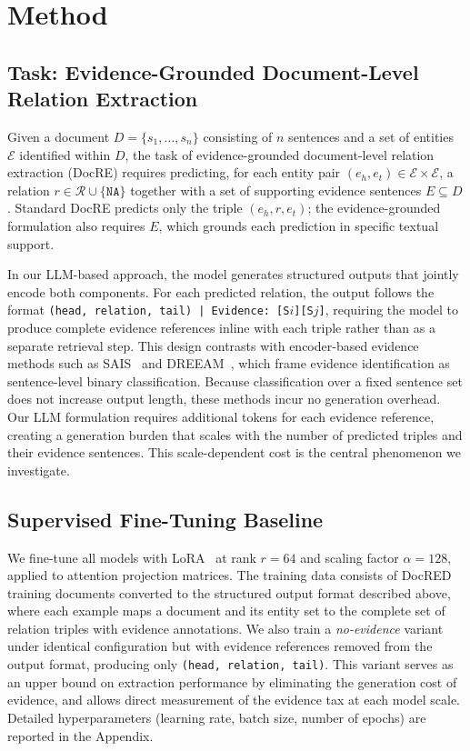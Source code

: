 \section{Method}
\label{sec:method}

\subsection{Task: Evidence-Grounded Document-Level Relation Extraction}
\label{sec:task}

Given a document $D = \{s_1, \ldots, s_n\}$ consisting of $n$ sentences and a set of entities $\mathcal{E}$ identified within $D$, the task of evidence-grounded document-level relation extraction (DocRE) requires predicting, for each entity pair $(e_h, e_t) \in \mathcal{E} \times \mathcal{E}$, a relation $r \in \mathcal{R} \cup \{\texttt{NA}\}$ together with a set of supporting evidence sentences $E \subseteq D$. Standard DocRE predicts only the triple $(e_h, r, e_t)$; the evidence-grounded formulation also requires $E$, which grounds each prediction in specific textual support.

In our LLM-based approach, the model generates structured outputs that jointly encode both components. For each predicted relation, the output follows the format \texttt{(head, relation, tail) | Evidence: [S$i$][S$j$]}, requiring the model to produce complete evidence references inline with each triple rather than as a separate retrieval step. This design contrasts with encoder-based evidence methods such as SAIS~\citep{xie2022sais} and DREEAM~\citep{ma2023dreeam}, which frame evidence identification as sentence-level binary classification. Because classification over a fixed sentence set does not increase output length, these methods incur no generation overhead. Our LLM formulation requires additional tokens for each evidence reference, creating a generation burden that scales with the number of predicted triples and their evidence sentences. This scale-dependent cost is the central phenomenon we investigate.


\subsection{Supervised Fine-Tuning Baseline}
\label{sec:sft}

We fine-tune all models with LoRA~\citep{hu2022lora} at rank $r{=}64$ and scaling factor $\alpha{=}128$, applied to attention projection matrices. The training data consists of DocRED~\citep{yao2019docred} training documents converted to the structured output format described above, where each example maps a document and its entity set to the complete set of relation triples with evidence annotations. We also train a \emph{no-evidence} variant under identical configuration but with evidence references removed from the output format, producing only \texttt{(head, relation, tail)}. This variant serves as an upper bound on extraction performance by eliminating the generation cost of evidence, and allows direct measurement of the evidence tax at each model scale. Detailed hyperparameters (learning rate, batch size, number of epochs) are reported in the Appendix.


